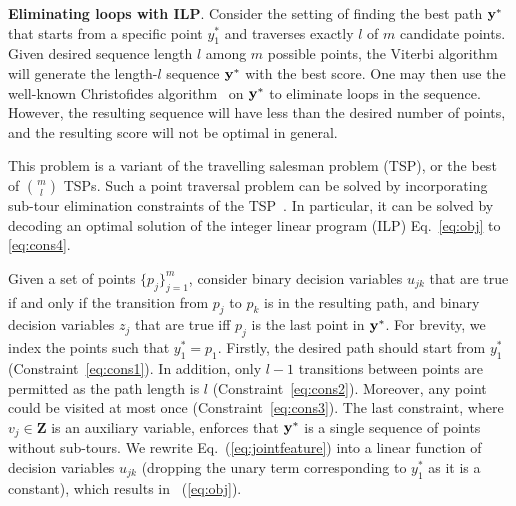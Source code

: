 %
\textbf{Eliminating loops with ILP}.
Consider the setting of finding the best path $\mathbf{y}^*$ that starts from a specific point $y_1^*$ and traverses exactly $l$ of $m$ candidate points.
Given desired sequence length $l$ among $m$ possible points, the Viterbi algorithm~\cite{tsochantaridis2005large}
will generate the length-$l$ sequence $\mathbf{y}^*$ with the best score. %
One may then use the well-known
Christofides algorithm~\cite{christofides1976} on $\mathbf{y}^*$ to eliminate loops in the sequence.
However, the resulting sequence will have less than the desired number of points, and the resulting score will not be optimal in general.

This problem is a variant of the travelling salesman problem (TSP), or the best of ${m \choose l}$ TSPs.
Such a point traversal problem can be solved by incorporating
sub-tour elimination constraints of the TSP~\cite{ijcai15,cikm16paper}.
In particular, %
it can be solved by decoding an optimal solution of the integer linear program (ILP) Eq.~\ref{eq:obj} to \ref{eq:cons4}.

Given a set of points $\{p_j\}_{j=1}^m$, 
consider binary decision variables $u_{jk}$ that are true if and only if
the transition from $p_j$ to $p_k$ is in the resulting path,
and binary decision variables $z_j$ that are true iff $p_j$ is the last point in $\mathbf{y}^*$.
For brevity, we index the points such that $y_1^* = p_1$.
Firstly, the desired path should start from $y_1^*$ (Constraint~\ref{eq:cons1}).
In addition, only $l\!-\!1$ transitions between points are permitted as the path length is $l$ (Constraint~\ref{eq:cons2}).
Moreover, any point could be visited at most once (Constraint~\ref{eq:cons3}).
The last constraint, where $v_j \in \mathbf{Z}$ is an auxiliary variable,
enforces that $\mathbf{y}^*$ is a single sequence of points without sub-tours.
We rewrite Eq.~(\ref{eq:jointfeature}) into a linear function of decision variables $u_{jk}$
(dropping the unary term corresponding to $y_1^*$ as it is a constant), which results in ~(\ref{eq:obj}).


